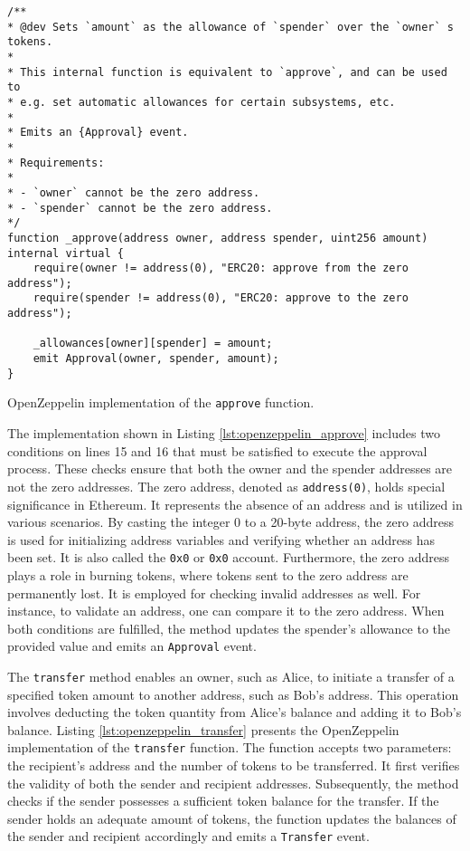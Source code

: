 \begin{listing}[!ht]
    \begin{verbatim}
/**
* @dev Sets `amount` as the allowance of `spender` over the `owner` s tokens.
*
* This internal function is equivalent to `approve`, and can be used to
* e.g. set automatic allowances for certain subsystems, etc.
*
* Emits an {Approval} event.
*
* Requirements:
*
* - `owner` cannot be the zero address.
* - `spender` cannot be the zero address.
*/
function _approve(address owner, address spender, uint256 amount) internal virtual {
    require(owner != address(0), "ERC20: approve from the zero address");
    require(spender != address(0), "ERC20: approve to the zero address");

    _allowances[owner][spender] = amount;
    emit Approval(owner, spender, amount);
}
    \end{verbatim}
    \caption{OpenZeppelin implementation of the \texttt{approve} function.}
    \label{lst:openzeppelin_approve}
\end{listing}

The implementation shown in Listing \ref{lst:openzeppelin_approve} includes two conditions on lines 15 and 16 that must be satisfied to execute the approval process. These checks ensure that both the owner and the spender addresses are not the zero addresses.
The zero address, denoted as \texttt{address(0)}, holds special significance in Ethereum. It represents the absence of an address and is utilized in various scenarios. By casting the integer 0 to a 20-byte address, the zero address is used for initializing address variables and verifying whether an address has been set. It is also called the \texttt{0x0} or \texttt{0x0} account.
Furthermore, the zero address plays a role in burning tokens, where tokens sent to the zero address are permanently lost. It is employed for checking invalid addresses as well. For instance, to validate an address, one can compare it to the zero address. When both conditions are fulfilled, the method updates the spender's allowance to the provided value and emits an \texttt{Approval} event.

The \texttt{transfer} method enables an owner, such as Alice, to initiate a transfer of a specified token amount to another address, such as Bob's address. This operation involves deducting the token quantity from Alice's balance and adding it to Bob's balance.
Listing \ref{lst:openzeppelin_transfer} presents the OpenZeppelin implementation of the \texttt{transfer} function. The function accepts two parameters: the recipient's address and the number of tokens to be transferred. It first verifies the validity of both the sender and recipient addresses. Subsequently, the method checks if the sender possesses a sufficient token balance for the transfer. If the sender holds an adequate amount of tokens, the function updates the balances of the sender and recipient accordingly and emits a \texttt{Transfer} event.

